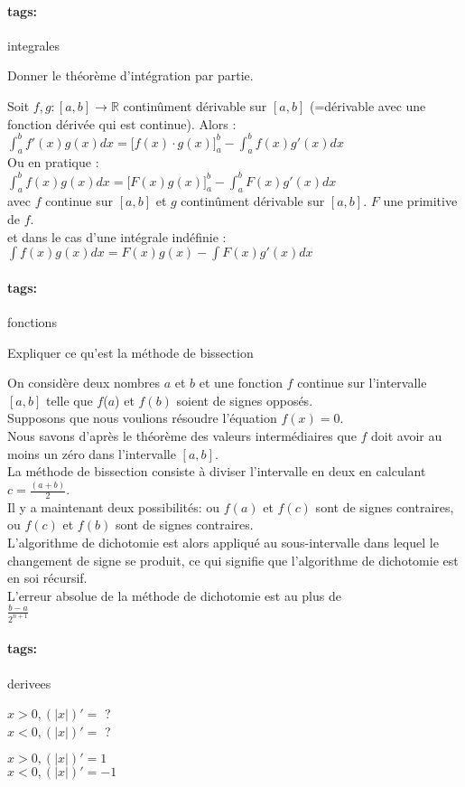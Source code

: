 \documentclass[12pt]{article}
\newcommand*{\xfield}[1]{\begin{mdframed}\centering #1\end{mdframed}\bigskip}
\newenvironment{note}{}{}
\newcommand*{\tags}[1]{\paragraph{tags: }#1}
\begin{document}
\begin{note}
	\tags{integrales}
	\xfield{Donner le théorème d'intégration par partie.}
	\xfield{Soit $f,g : [a,b] \to \mathbb{R}$ continûment dérivable sur $[a,b]$ (=dérivable avec une fonction dérivée qui est continue). Alors :\\
	$\int_a^b f'(x)g(x) dx = \big[f(x)\cdot g(x)\big]_a^b - \int_a^b f(x)g'(x) dx$\\
	Ou en pratique :\\
	$\int_a^b f(x)g(x) dx = \big[ F(x) g(x)\big]_a^b - \int_a^b F(x) g'(x) dx$\\
	avec $f$ continue sur $[a,b]$ et $g$ continûment dérivable sur $[a,b]$. $F$ une primitive de $f$.\\
	et dans le cas d'une intégrale indéfinie :\\
	$\int f(x)g(x) dx = F(x)g(x) - \int F(x)g'(x) dx$ }
\end{note}

\begin{note}
	\tags{fonctions}
	\xfield{Expliquer ce qu'est la méthode de bissection}
	\xfield{On considère deux nombres $a$ et $b$ et une fonction $f$ continue sur l'intervalle $[a, b]$ telle que $f$($a$) et $f(b)$ soient de signes opposés.\\
Supposons que nous voulions résoudre l’équation $f(x) = 0$.\\
Nous savons d'après le théorème des valeurs intermédiaires que $f$ doit avoir au moins un zéro dans l’intervalle $[a, b]$.\\
La méthode de bissection consiste à diviser l’intervalle en deux en calculant $c = \frac{(a+b)}{2}$.\\
Il y a maintenant deux possibilités: ou $f(a)$ et $f(c)$ sont de signes contraires, ou $f(c)$ et $f(b)$ sont de signes contraires.\\
L’algorithme de dichotomie est alors appliqué au sous-intervalle dans lequel le changement de signe se produit, ce qui signifie que l’algorithme de dichotomie est en soi récursif.\\
L’erreur absolue de la méthode de dichotomie est au plus de \\
$\frac{b-a}{2^{n+1}}$}
\end{note}

\begin{note}
	\tags{derivees}
	\xfield{$x>0, (\vert x\vert )' = $ ?\\
			$x<0, (\vert x\vert )' = $ ? }
	\xfield{$x>0, (\vert x\vert )' = 1$\\
			$x<0, (\vert x\vert )' = -1$}
\end{note}
\end{document}
